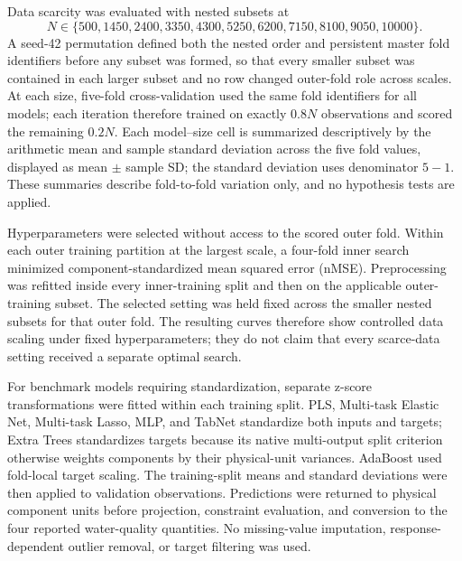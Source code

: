 \documentclass[a4paper,fleqn]{cas-sc}
\begin{document}
Data scarcity was evaluated with nested subsets at
\begin{equation}
N\in\{500,1450,2400,3350,4300,5250,6200,7150,8100,9050,10000\}.
\end{equation}
A seed-42 permutation defined both the nested order and persistent master fold identifiers before any subset was formed, so that every smaller subset was contained in each larger subset and no row changed outer-fold role across scales. At each size, five-fold cross-validation used the same fold identifiers for all models; each iteration therefore trained on exactly $0.8N$ observations and scored the remaining $0.2N$. Each model--size cell is summarized descriptively by the arithmetic mean and sample standard deviation across the five fold values, displayed as mean $\pm$ sample SD; the standard deviation uses denominator $5-1$. These summaries describe fold-to-fold variation only, and no hypothesis tests are applied.

Hyperparameters were selected without access to the scored outer fold. Within each outer training partition at the largest scale, a four-fold inner search minimized component-standardized mean squared error (nMSE). Preprocessing was refitted inside every inner-training split and then on the applicable outer-training subset. The selected setting was held fixed across the smaller nested subsets for that outer fold. The resulting curves therefore show controlled data scaling under fixed hyperparameters; they do not claim that every scarce-data setting received a separate optimal search.

For benchmark models requiring standardization, separate z-score transformations were fitted within each training split. PLS, Multi-task Elastic Net, Multi-task Lasso, MLP, and TabNet standardize both inputs and targets; Extra Trees standardizes targets because its native multi-output split criterion otherwise weights components by their physical-unit variances. AdaBoost used fold-local target scaling. The training-split means and standard deviations were then applied to validation observations. Predictions were returned to physical component units before projection, constraint evaluation, and conversion to the four reported water-quality quantities. No missing-value imputation, response-dependent outlier removal, or target filtering was used.
\end{document}
